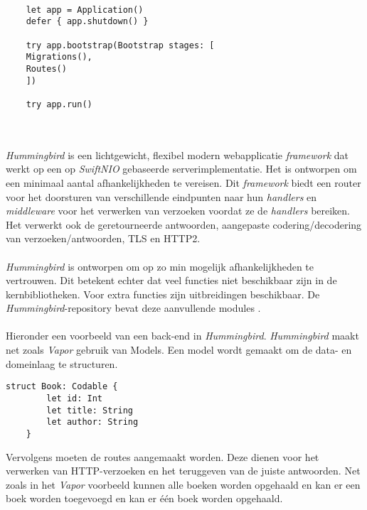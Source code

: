 \begin{lstlisting}[caption=Vapor example]
    
    let app = Application()
    defer { app.shutdown() }
    
    try app.bootstrap(Bootstrap stages: [
    Migrations(),
    Routes()
    ])
    
    try app.run()

\end{lstlisting}
 \\  \\


\textit{Hummingbird} is een lichtgewicht, flexibel modern webapplicatie \textit{framework} dat werkt op een op \textit{SwiftNIO} gebaseerde serverimplementatie. Het is ontworpen om een minimaal aantal afhankelijkheden te vereisen. Dit \textit{framework} biedt een router voor het doorsturen van verschillende eindpunten naar hun \textit{handlers} en \\\textit{middleware }voor het verwerken van verzoeken voordat ze de \textit{handlers} bereiken. Het verwerkt ook de geretourneerde antwoorden, aangepaste codering/decodering van verzoeken/antwoorden, TLS en HTTP2.  \\  \\
\textit{Hummingbird} is ontworpen om op zo min mogelijk afhankelijkheden te vertrouwen. Dit betekent echter dat veel functies niet beschikbaar zijn in de kernbibliotheken. Voor extra functies zijn uitbreidingen beschikbaar. De \textit{Hummingbird}-repository bevat deze aanvullende modules  \autocite{2024}.  \\  \\
Hieronder een voorbeeld van een back-end in \textit{Hummingbird}. \textit{Hummingbird} maakt net zoals \textit{Vapor} gebruik van Models. Een model wordt gemaakt om de data- en domeinlaag te structuren. 
\begin{lstlisting}[caption=Himmingbird example - Model]
    struct Book: Codable {
        let id: Int
        let title: String
        let author: String
    }
\end{lstlisting}

Vervolgens moeten de routes aangemaakt worden. Deze dienen voor het verwerken van HTTP-verzoeken en het teruggeven van de juiste antwoorden. Net zoals in het \textit{Vapor} voorbeeld kunnen alle boeken worden opgehaald en kan er een boek worden toegevoegd en kan er één boek worden opgehaald. 

